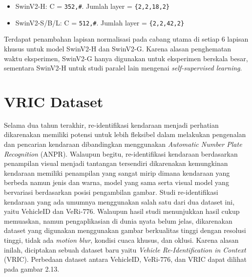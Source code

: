 \begin{itemize}[nolistsep]

  \item SwinV2-H: C = \verb|352,#|. Jumlah layer = \verb|{2,2,18,2}|

  \item SwinV2-S/B/L: C = \verb|512,#|. Jumlah layer = \verb|{2,2,42,2}|

\end{itemize}

Terdapat penambahan lapisan normalisasi pada cabang utama di setiap 6 lapisan khusus untuk model SwinV2-H dan SwinV2-G. Karena alasan penghematan waktu eksperimen, \linebreak SwinV2-G hanya digunakan untuk eksperimen 
berskala besar, sementara SwinV2-H untuk studi paralel lain mengenai \emph{self-supervised learning}.\parencite{Liuv22021}

\section{VRIC Dataset}
\label{sec:vricdataset}

Selama dua tahun terakhir, re-identifikasi kendaraan menjadi perhatian dikarenakan \linebreak memiliki potensi untuk lebih fleksibel dalam melakukan pengenalan dan pencarian kendaraan dibandingkan 
menggunakan \emph{Automatic Number Plate Recognition} (ANPR). Walaupun begitu, re-identifikasi kendaraan berdasarkan penampilan visual menjadi tantangan tersendiri dikarenakan kemungkinan 
kendaraan memiliki penampilan yang sangat mirip dimana kendaraan yang berbeda namun jenis dan warna, model yang sama serta visual model yang bervariasi \linebreak berdasarkan posisi pengambilan 
gambar. Studi re-identifikasi kendaraan yang ada umumnya menggunakan salah satu dari dua dataset ini, yaitu VehicleID dan VeRi-776. Walaupun hasil studi menunjukkan hasil cukup memuaskan, 
namun pengaplikasian di dunia nyata belum jelas, dikarenakan dataset yang digunakan menggunakan gambar berkualitas tinggi dengan resolusi tinggi, tidak ada \emph{motion blur}, kondisi cuaca 
khusus, dan oklusi. Karena alasan inilah, diciptakan sebuah dataset baru yaitu \emph{Vehicle Re-Identification in Context} (VRIC). Perbedaan dataset antara VehicleID, VeRi-776, dan VRIC 
dapat dilihat pada gambar 2.13.\parencite{Kanaci2018}

